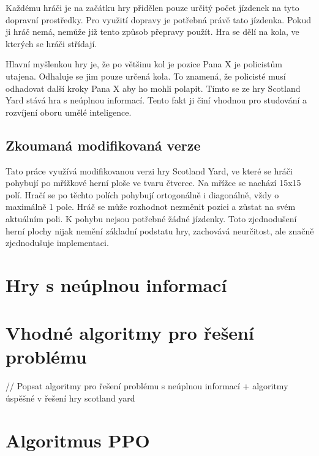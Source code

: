 Každému hráči je na začátku hry přidělen pouze určitý počet jízdenek na tyto dopravní prostředky. Pro využití dopravy je potřebná právě tato jízdenka. Pokud ji hráč nemá, nemůže již tento způsob přepravy použít.
Hra se dělí na kola, ve kterých se hráči střídají.


Hlavní myšlenkou hry je, že po většinu kol je pozice Pana X je policistům utajena. Odhaluje se jim pouze určená kola. To znamená, že policisté musí odhadovat další kroky Pana X aby ho mohli polapit.
Tímto se ze hry Scotland Yard stává hra s neúplnou informací. Tento fakt ji činí vhodnou pro studování a rozvíjení oboru umělé inteligence.

\subsection*{Zkoumaná modifikovaná verze}

Tato práce využívá modifikovanou verzi hry Scotland Yard, ve které se hráči pohybují po mřížkové herní ploše ve tvaru čtverce.
Na mřížce se nachází 15x15 polí. Hračí se po těchto polích pohybují ortogonálně i diagonálně, vždy o maximálně 1 pole.
Hráč se může rozhodnot nezměnit pozici a zůstat na svém aktuálním poli.
K pohybu nejsou potřebné žádné jízdenky.
Toto zjednodušení herní plochy nijak nemění základní podstatu hry, zachovává neurčitost, ale značně zjednodušuje implementaci.

\section{Hry s neúplnou informací}



\section{Vhodné algoritmy pro řešení problému} // Popsat algoritmy pro řešení problému s neúplnou informací + algoritmy úspěšné v řešení hry scotland yard
\section{Algoritmus PPO}

